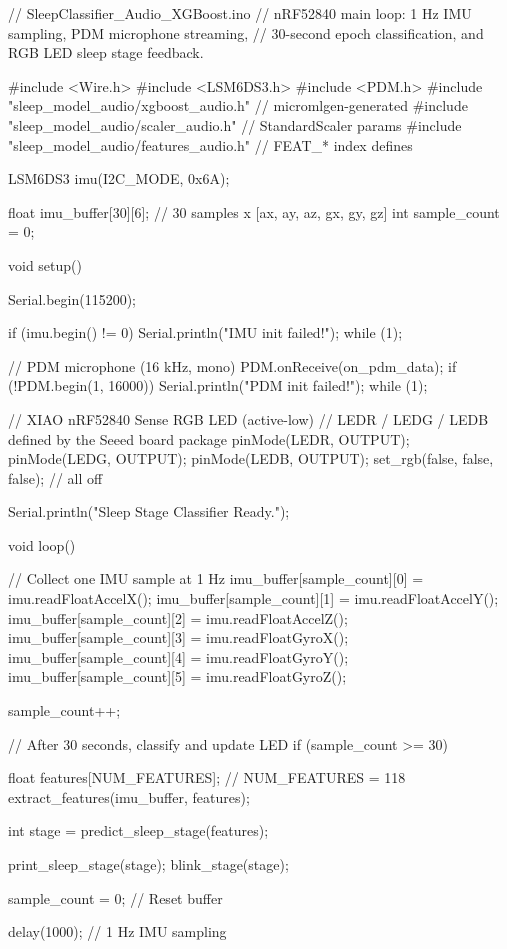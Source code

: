 \begin{ccode}
// SleepClassifier_Audio_XGBoost.ino
// nRF52840 main loop: 1 Hz IMU sampling, PDM microphone streaming,
// 30-second epoch classification, and RGB LED sleep stage feedback.

#include <Wire.h>
#include <LSM6DS3.h>
#include <PDM.h>
#include "sleep_model_audio/xgboost_audio.h"   // micromlgen-generated
#include "sleep_model_audio/scaler_audio.h"     // StandardScaler params
#include "sleep_model_audio/features_audio.h"   // FEAT_* index defines

LSM6DS3 imu(I2C_MODE, 0x6A);

float imu_buffer[30][6];   // 30 samples x [ax, ay, az, gx, gy, gz]
int   sample_count = 0;

void setup() {
    Serial.begin(115200);

    if (imu.begin() != 0) {
        Serial.println("IMU init failed!");
        while (1);
    }

    // PDM microphone (16 kHz, mono)
    PDM.onReceive(on_pdm_data);
    if (!PDM.begin(1, 16000)) {
        Serial.println("PDM init failed!");
        while (1);
    }

    // XIAO nRF52840 Sense RGB LED (active-low)
    // LEDR / LEDG / LEDB defined by the Seeed board package
    pinMode(LEDR, OUTPUT);
    pinMode(LEDG, OUTPUT);
    pinMode(LEDB, OUTPUT);
    set_rgb(false, false, false);   // all off

    Serial.println("Sleep Stage Classifier Ready.");
}

void loop() {
    // Collect one IMU sample at 1 Hz
    imu_buffer[sample_count][0] = imu.readFloatAccelX();
    imu_buffer[sample_count][1] = imu.readFloatAccelY();
    imu_buffer[sample_count][2] = imu.readFloatAccelZ();
    imu_buffer[sample_count][3] = imu.readFloatGyroX();
    imu_buffer[sample_count][4] = imu.readFloatGyroY();
    imu_buffer[sample_count][5] = imu.readFloatGyroZ();

    sample_count++;

    // After 30 seconds, classify and update LED
    if (sample_count >= 30) {
        float features[NUM_FEATURES];   // NUM_FEATURES = 118
        extract_features(imu_buffer, features);

        int stage = predict_sleep_stage(features);

        print_sleep_stage(stage);
        blink_stage(stage);

        sample_count = 0;   // Reset buffer
    }

    delay(1000);   // 1 Hz IMU sampling
}
\end{ccode}


